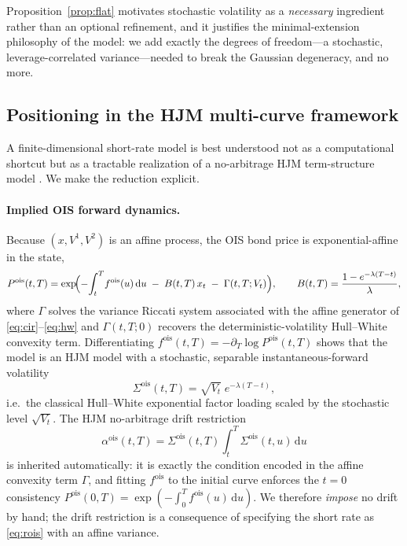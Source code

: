 \documentclass[11pt]{article}
\newcommand{\ois}{\mathrm{ois}}
\newcommand{\dd}{\,\mathrm{d}}
\theoremstyle{plain}
\theoremstyle{definition}
\begin{document}
Proposition~\ref{prop:flat} motivates stochastic volatility as a
\emph{necessary} ingredient rather than an optional refinement, and it justifies
the minimal-extension philosophy of the model: we add exactly the degrees of
freedom---a stochastic, leverage-correlated variance---needed to break the
Gaussian degeneracy, and no more.

\subsection{Positioning in the HJM multi-curve framework}

A finite-dimensional short-rate model is best understood not as a computational
shortcut but as a tractable realization of a no-arbitrage HJM term-structure
model \citep{ChiarellaKwon2003}. We make the reduction explicit.

\paragraph{Implied OIS forward dynamics.}
Because $(x, V^1, V^2)$ is an affine process, the OIS bond price is
exponential-affine in the state,
\begin{equation}
P^{\ois}(t,T) = \exp\!\Bigl(-\!\int_t^T\! f^{\ois}(u)\dd u
   \;-\; B(t,T)\,x_t \;-\; \Gamma(t,T;V_t)\Bigr),
   \qquad
   B(t,T) = \frac{1-e^{-\lambda(T-t)}}{\lambda},
\label{eq:bond}
\end{equation}
where $\Gamma$ solves the variance Riccati system associated with the affine
generator of \eqref{eq:cir}--\eqref{eq:hw} and $\Gamma(t,T;0)$ recovers the
deterministic-volatility Hull--White convexity term. Differentiating
$f^{\ois}(t,T) = -\partial_T \log P^{\ois}(t,T)$ shows that the model is an HJM
model with a stochastic, separable instantaneous-forward volatility
\begin{equation}
\Sigma^{\ois}(t,T) = \sqrt{V_t}\;e^{-\lambda(T-t)},
\label{eq:hjmvol}
\end{equation}
i.e.\ the classical Hull--White exponential factor loading scaled by the
stochastic level $\sqrt{V_t}$. The HJM no-arbitrage drift restriction
\begin{equation}
\alpha^{\ois}(t,T) = \Sigma^{\ois}(t,T)\int_t^T \Sigma^{\ois}(t,u)\dd u
\label{eq:hjmdrift}
\end{equation}
is inherited automatically: it is exactly the condition encoded in the affine
convexity term $\Gamma$, and fitting $f^{\ois}$ to the initial curve enforces
the $t=0$ consistency $P^{\ois}(0,T) = \exp(-\int_0^T f^{\ois}(u)\dd u)$. We
therefore \emph{impose} no drift by hand; the drift restriction is a consequence
of specifying the short rate as \eqref{eq:rois} with an affine variance.
\end{document}

